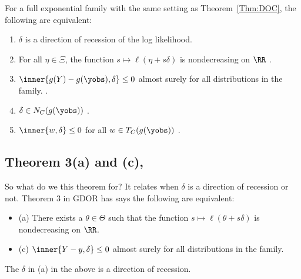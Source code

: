 \begin{theorem} \label{Thm:DOR}
For a full exponential family with the same setting as Theorem~\ref{Thm:DOC},
the following are equivalent:
\begin{enumerate}
\item $\delta$ is a direction of recession of the log likelihood.
\item For all $\eta \in \Xi$, the function $s \mapsto \ell( \eta + s\delta)$ is 
nondecreasing on $\RR$ \cite[Theorem 3 (b)]{Geyer:gdor}.
\item $\inner{g(Y) - g(\yobs),\delta} \leq 0$ almost surely for all distributions in 
the family. \cite[Theorem 3 (d)]{Geyer:gdor}.
\item $\delta \in N_C(g(\yobs))$ \cite[Theorem 3 (e)]{Geyer:gdor}.
\item $\inner{w,\delta} \leq 0$ for all $w \in T_C(g(\yobs))$ \cite[Theorem 3 (f)]
{Geyer:gdor}.
\end{enumerate}
\end{theorem}


\subsection{Theorem 3(a) and (c), \citet[p. 270]{Geyer:gdor}}
So what do we this theorem for?  It relates when $\delta$ is a direction of recession 
or not.  Theorem 3 in GDOR has says the following are equivalent:
\begin{itemize}
\item (a) There exists a $\theta \in \Theta$ such that the function $s \mapsto \ell
(\theta+s\delta)$ is nondecreasing on $\RR$.
\item (c) $\inner{Y-y, \delta} \leq 0$ almost surely for all distributions in the 
family.
\end{itemize}

The $\delta$ in (a) in the above is a direction of recession.  

